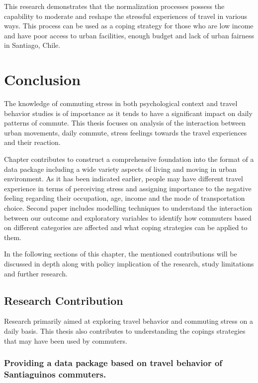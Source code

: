 \documentclass[
11pt, %
oneside, %
english, %
singlespacing, %
]{macthesis} %
\begin{document}
This research demonstrates that the normalization processes possess the capability to moderate and reshape the stressful experiences of travel in various ways. This process can be used as a coping strategy for those who are low income and have poor access to urban facilities, enough budget and lack of urban fairness in Santiago, Chile.

\hypertarget{conclusion-1}{%
\chapter{Conclusion}\label{conclusion-1}}

The knowledge of commuting stress in both psychological context and travel behavior studies is of importance as it tends to have a significant impact on daily patterns of commute. This thesis focuses on analysis of the interaction between urban movements, daily commute, stress feelings towards the travel experiences and their reaction.

Chapter contributes to construct a comprehensive foundation into the format of a data package including a wide variety aspects of living and moving in urban environment. As it has been indicated earlier, people may have different travel experience in terms of perceiving stress and assigning importance to the negative feeling regarding their occupation, age, income and the mode of transportation choice. Second paper includes modelling techniques to understand the interaction between our outcome and exploratory variables to identify how commuters based on different categories are affected and what coping strategies can be applied to them.

In the following sections of this chapter, the mentioned contributions will be discussed in depth along with policy implication of the research, study limitations and further research.

\hypertarget{research-contribution}{%
\section{Research Contribution}\label{research-contribution}}

Research primarily aimed at exploring travel behavior and commuting stress on a daily basis. This thesis also contributes to understanding the copings strategies that may have been used by commuters.

\hypertarget{providing-a-data-package-based-on-travel-behavior-of-santiaguinos-commuters.}{%
\subsection{Providing a data package based on travel behavior of Santiaguinos commuters.}\label{providing-a-data-package-based-on-travel-behavior-of-santiaguinos-commuters.}}
\end{document}
